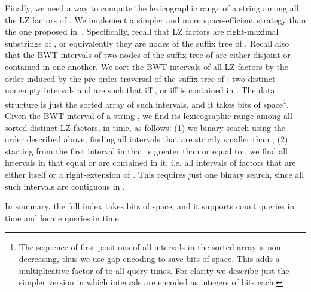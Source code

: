 \documentclass[a4paper,UKenglish]{lipics-v2016}
\begin{document}
Finally, we need a way to compute the lexicographic range of a string among all the LZ factors of . We implement a simpler and more space-efficient strategy than the one proposed in~\cite{belazzougui2015composite}. Specifically, recall that LZ factors are right-maximal substrings of , or equivalently they are nodes of the suffix tree of . Recall also that the BWT intervals of two nodes of the suffix tree of  are either disjoint or contained in one another. We sort the BWT intervals of all LZ factors by the order induced by the pre-order traversal of the suffix tree of : two distinct nonempty intervals  and  are such that  iff , or iff  is contained in . The data structure is just the sorted array  of such intervals, and it takes  bits of space\footnote{The sequence of first positions of all intervals in the sorted array is non-decreasing, thus we use gap encoding to save  bits of space. This adds a multiplicative factor of  to all query times. For clarity we describe just the simpler version in which intervals are encoded as  integers of  bits each.}. Given the BWT interval  of a string , we find its lexicographic range among all sorted distinct LZ factors, in  time, as follows: (1) we binary-search  using the order described above, finding all intervals that are strictly smaller than ; (2) starting from the first interval in  that is greater than or equal to , we find all intervals in  that equal  or are contained in it, i.e. all intervals of factors that are either  itself or a right-extension of . This requires just one binary search, since all such intervals are contiguous in .


In summary, the full index takes  bits of space, and it supports count queries in  time and locate queries in  time.
\end{document}
